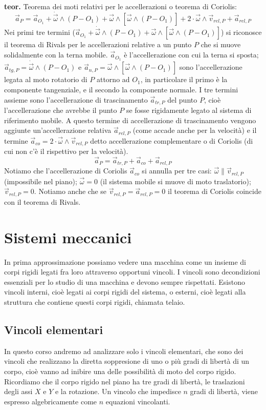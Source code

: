 \textbf{teor.} Teorema dei moti relativi per le accellerazioni o teorema di Coriolis:
\[
    \vec{a}_P = \vec{a}_{O_1} + \dot{\vec{\omega}} \land (P-O_1) + \vec{\omega} \land [\vec{\omega}\land (P-O_1)] + 2 \cdot \vec{\omega}\land \vec{v}_{rel,P} + \vec{a}_{rel,P}
\]
Nei primi tre termini ($\vec{a}_{O_1} + \dot{\vec{\omega}} \land (P-O_1) + \vec{\omega} \land [\vec{\omega}\land (P-O_1)]$) si riconosce il teorema di Rivals per le accellerazioni relative a un punto $P$ che si muove solidalmente con la terna mobile. $\vec{a}_{O_1}$ è l'accellerazione con cui la terna si sposta; $\vec{a}_{tg,P} = \dot{\vec{\omega}} \land (P-O_1)$ e $\vec{a}_{n,P} = \vec{\omega} \land [\vec{\omega}\land (P-O_1)]$ sono l'accellerazione legata al moto rotatorio di $P$ attorno ad $O_1$, in particolare il primo è la componente tangenziale, e il secondo la componente normale. I tre termini assieme sono l'accellerazione di trascinamento $\vec{a}_{tr,P}$ del punto $P$, cioè l'accellerazione che avrebbe il punto $P$ se fosse rigidamente legato al sistema di riferimento mobile.\newline
A questo termine di accellerazione di trascinamento vengono aggiunte un'accellerazione relativa $\vec{a}_{rel,P}$ (come accade anche per la velocità) e il termine $\vec{a}_{co} = 2 \cdot \vec{\omega}\land \vec{v}_{rel,P}$ detto accellerazione complementare o di Coriolis (di cui non c'è il rispettivo per la velocità).
\[
    \vec{a}_P = \vec{a}_{tr,P} + \vec{a}_{co} + \vec{a}_{rel,P}
\]
Notiamo che l'accellerazione di Coriolis $\vec{a}_{co}$ si annulla per tre casi: $\vec{\omega} \parallel \vec{v}_{rel,P}$ (impossibile nel piano); $\vec{\omega} = 0$ (il sistema mobile si muove di moto traslatorio); $\vec{v}_{rel,P} = 0$.\newline
Notiamo anche che se $\vec{v}_{rel,P} = \vec{a}_{rel,P} = 0$ il teorema di Coriolis coincide con il teorema di Rivals.
\newpage
\section{Sistemi meccanici}
In prima approssimazione possiamo vedere una macchina come un insieme di corpi rigidi legati fra loro attraverso opportuni vincoli. I vincoli sono decondizioni essenziali per lo studio di una macchina e devono sempre rispettati.\newline
Esistono vincoli interni, cioè legati ai corpi rigidi del sistema, o esterni, cioè legati alla struttura che contiene questi corpi rigidi, chiamata telaio.
\subsection{Vincoli elementari}
In questo corso andremo ad analizzare solo i vincoli elementari, che sono dei vincoli che realizzano la diretta soppresione di uno o più gradi di libertà di un corpo, cioè vanno ad inibire una delle possibilità di moto del corpo rigido. Ricordiamo che il corpo rigido nel piano ha tre gradi di libertà, le traslazioni degli assi $X$ e $Y$ e la rotazione.\newline
Un vincolo che impedisce $n$ gradi di libertà, viene espresso algebricamente come $n$ equazioni vincolanti.

